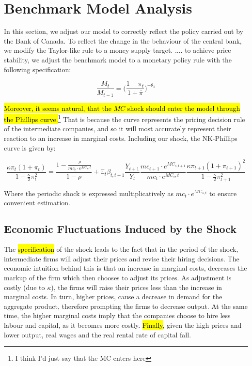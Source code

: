\documentclass[12pt]{article}
\begin{document}
\newpage
\section{Benchmark Model Analysis}\label{s:benchmark_model}

In this section, we adjust our model to correctly reflect the policy carried out by the Bank of Canada. To reflect the change in the behaviour of the central bank, we modify the Taylor-like rule to a money supply target. .... to achieve price stability, we adjust the benchmark model to a monetary policy rule with the following specification:


\begin{equation}\label{eq:baseline_rule}
    \frac{M_t}{M_{t-1}} = \Big(\frac{1+\pi_{t}}{1+ \bar \pi}\Big)^{-\theta_{\pi}}
\end{equation}

\hl{Moreover, it seems  natural, that the $MC$ shock should enter the model through the Phillips curve.}\footnote{I think I'd just say that the MC enters here} That is because the curve represents the pricing decision rule of the intermediate companies, and so it will most accurately represent their reaction to an increase in marginal costs. Including our shock, the NK-Phillips curve is given by: 

\begin{equation}
    \frac{\kappa \pi_t (1 + \pi_t)}{1 - \frac{\kappa}{2} \pi_t^2}
    = \frac{1 - \frac{\rho}{mc_t \cdot e^{MC_s,t}}}{1 - \rho}
    + \mathbb{E}_t \beta_{t,t+1}
    \frac{Y_{t+1}}{Y_t}
    \frac{mc_{t+1} \cdot e^{MC_{s,t+1}}}{mc_t \cdot e^{MC_s,t}}
    \frac{\kappa \pi_{t+1} (1 + \pi_{t+1})^{2}}{1 - \frac{\kappa}{2} \pi_{t+1}^2}
\end{equation}

Where the periodic shock is expressed multiplicatively as $mc_t \cdot e^{MC_{s, t}}$ to ensure convenient estimation.

\subsection*{Economic Fluctuations Induced by the Shock}

The \hl{specification} of the shock leads to the fact that in the period of the shock, intermediate firms will adjust their prices and revise their hiring decisions. The economic intuition behind this is that an increase in marginal costs, decreases the markup of the firm which then chooses to adjust its prices. As adjustment is costly (due to $\kappa$), the firms will raise their prices less than the increase in marginal costs. In turn, higher prices, cause a decrease in demand for the aggregate product, therefore prompting the firms to decrease output. At the same time, the higher marginal costs imply that the companies choose to hire less labour and capital, as it becomes more costly. \hl{Finally}, given the high prices and lower output, real wages and the real rental rate of capital fall.
\end{document}

